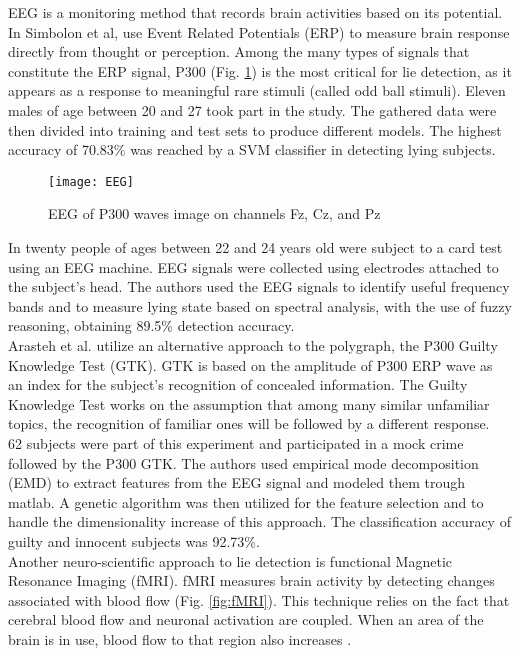 EEG is a monitoring method that records brain activities based on its potential. \\

In \cite{7440177} Simbolon et al, use Event Related Potentials (ERP) to measure brain response directly from thought or perception. Among the many types of signals that constitute the ERP signal, P300 (Fig. \ref{fig:EEG}) is the most critical for lie detection, as it appears as a response to meaningful rare stimuli (called odd ball stimuli). Eleven males of age between 20 and 27 took part in the study. The gathered data were then divided into training and test sets to produce different models. The highest accuracy of 70.83\% was reached by a SVM classifier in detecting lying subjects.\\

\begin{figure}[H]
	\centering
	\texttt{[image: EEG]}
	\caption{EEG of P300 waves image on channels Fz, Cz, and Pz}
	\label{fig:EEG}
\end{figure}

In \cite{Lai2017} twenty people of ages between 22 and 24 years old were subject to a card test using an EEG machine. EEG signals were collected using electrodes attached to the subject’s head. The authors used the EEG signals to identify useful frequency bands and to measure lying state based on spectral analysis, with the use of fuzzy reasoning, obtaining 89.5\% detection accuracy. \\

Arasteh et al. \cite{7511728} utilize an alternative approach to the polygraph, the P300 Guilty Knowledge Test (GTK). GTK is based on the amplitude of P300 ERP wave as an index for the subject's recognition of concealed information. The Guilty Knowledge Test works on the assumption that among many similar unfamiliar topics, the recognition of familiar ones will be followed by a different response. \\
62 subjects were part of this experiment and participated in a mock crime followed by the P300 GTK. The authors used empirical mode decomposition (EMD) to extract features from the EEG signal and modeled them trough matlab. A genetic algorithm was then utilized for the feature selection and to handle the dimensionality increase of this approach. The classification accuracy of guilty and innocent subjects was 92.73\%. \\

Another neuro-scientific approach to lie detection is functional Magnetic Resonance Imaging (fMRI). fMRI measures brain activity by detecting changes associated with blood flow (Fig. \ref{fig:fMRI}). This technique relies on the fact that cerebral blood flow and neuronal activation are coupled. When an area of the brain is in use, blood flow to that region also increases \cite{WikifMRI}.\\

